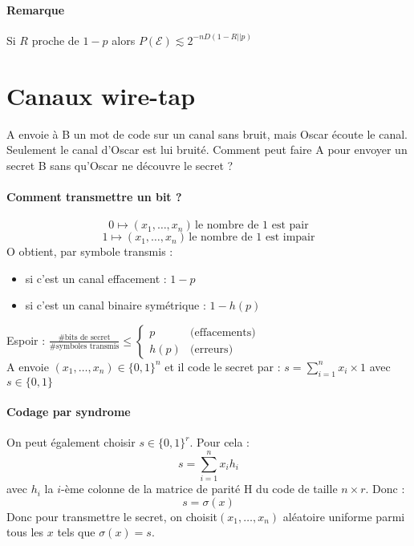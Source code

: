 \documentclass[12pt,a4paper]{report}
\begin{document}
\paragraph{Remarque\\}
Si $R$ proche de $1-p$ alors $ P(\mathcal{E}) \lesssim 2^{-nD(1-R || p)} $
\section{Canaux wire-tap}
A envoie à B un mot de code sur un canal sans bruit, mais Oscar écoute le canal. Seulement le canal d'Oscar est lui bruité. Comment peut faire A pour envoyer un secret  B sans qu'Oscar ne découvre le secret ?
\paragraph{Comment transmettre un bit ?}
$$ 0 \longmapsto (x_1,\ldots,x_n) \, \mbox{le nombre de 1 est pair} $$
$$ 1 \longmapsto (x_1,\ldots,x_n) \, \mbox{le nombre de 1 est impair} $$
O obtient, par symbole transmis :
\begin{itemize}
\item si c'est un canal  effacement : $1-p$
\item si c'est un canal binaire symétrique : $1 -h(p)$
\end{itemize}
\vspace{1em}

Espoir : $\displaystyle \frac{\# \mbox{bits de secret}}{\# \mbox{symboles transmis}} \leqslant \left\{ \begin{array}{ll}
p & \mbox{(effacements)}\\
h(p) & \mbox{(erreurs)} \end{array}\right.$\\
A envoie $(x_1,\ldots,x_n) \in \{0,1\}^n $ et il code le secret par : $\displaystyle s=\sum_{i=1}^n x_i \times 1$ avec $s \in \{0,1\}$

\paragraph{Codage par syndrome\\}
On peut également choisir $s  \in \{0,1\}^r$. Pour cela :
$$ s = \sum_{i=1}^{n} x_i h_i $$
avec $ h_i$ la $i$-ème colonne de la matrice de parité H du code de taille $n\times r$. Donc :
$$ s= \sigma(x) $$
Donc pour transmettre le secret, on choisit$(x_1,\ldots,x_n)$ aléatoire uniforme parmi tous les $x$ tels que $\sigma(x) = s$.
\end{document}
